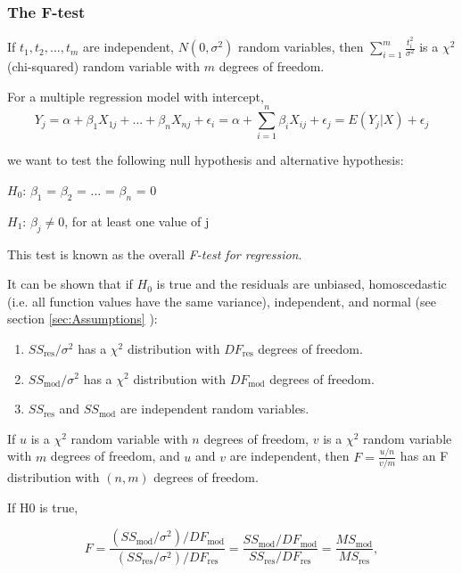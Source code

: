 \subsubsection{The F-test}

If $t_1, t_2, ... , t_m$ are independent, $N(0, \sigma^2)$ random variables, then $\sum_{i=1}^m \frac{t_i^2}{\sigma^2}$ is a $\chi^2$ (chi-squared) random variable with $m$ degrees of freedom.

For a multiple regression model with intercept,
\begin{equation}
  Y_j = \alpha + \beta_1 X_{1j} + ... + \beta_n X_{nj} + \epsilon_i = \alpha + \sum_{i=1}^n \beta_i X_{ij} + \epsilon_j = E(Y_j | X) + \epsilon_j
\end{equation}

we want to test the following null hypothesis and alternative hypothesis:

        $H_0$:   $\beta_1$ = $\beta_2$ = ... = $\beta_n$ = 0

        $H_1$:   $\beta_j \neq 0$, for at least one value of j

This test is known as the overall \emph{F-test for regression}.

It can be shown that if $H_0$ is true and the residuals are unbiased, homoscedastic (i.e. all function values have the same variance), independent, and normal (see section \ref{sec:Assumptions} ):

\begin{enumerate}
  \item $SS_\text{res} / \sigma^2$ has a $\chi^2$ distribution with $DF_\text{res}$ degrees of freedom.
  \item $SS_\text{mod} / \sigma^2$ has a $\chi^2$ distribution with $DF_\text{mod}$ degrees of freedom.
  \item $SS_\text{res}$ and $SS_\text{mod}$ are independent random variables.
\end{enumerate}

If $u$ is a $\chi^2$ random variable with $n$ degrees of freedom, $v$ is a $\chi^2$ random variable with $m$ degrees of freedom, and $u$ and $v$ are independent, then $F = \frac{u/n}{v/m}$ has an F distribution with $(n,m)$ degrees of freedom.

If H0 is true,

\begin{equation}
  F = \frac{(SS_\text{mod}/\sigma^2)/DF_\text{mod}}{(SS_\text{res}/\sigma^2)/DF_\text{res}} = \frac{SS_\text{mod}/DF_\text{mod}}{SS_\text{res}/DF_\text{res}} = \frac{MS_\text{mod}}{MS_\text{res}},
\end{equation}


